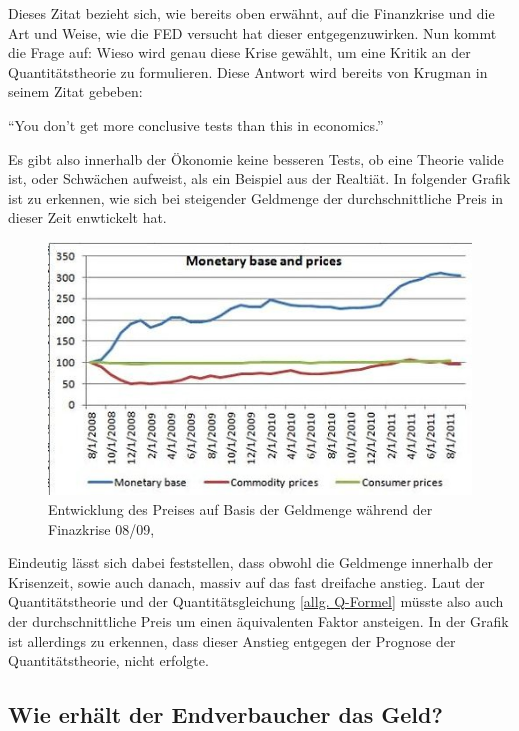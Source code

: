 Dieses Zitat bezieht sich, wie bereits oben erwähnt, auf die Finanzkrise und die Art und Weise, wie die FED versucht hat dieser entgegenzuwirken. Nun kommt die Frage auf: Wieso wird genau diese Krise gewählt, um eine Kritik an der Quantitätstheorie zu formulieren. Diese Antwort wird bereits von Krugman in seinem Zitat gebeben:
\begin{center}
    \enquote{You don’t get more conclusive tests than this in economics.}
\end{center}

Es gibt also innerhalb der Ökonomie keine besseren Tests, ob eine Theorie valide ist, oder Schwächen aufweist, als ein Beispiel aus der Realtiät. In folgender Grafik ist zu erkennen, wie sich bei steigender Geldmenge der durchschnittliche Preis in dieser Zeit enwtickelt hat.

\begin{figure}[H]
    \centering
    \includegraphics{img/100711krugman3-blog480.jpg}
    \caption{Entwicklung des Preises auf Basis der Geldmenge während der Finazkrise 08/09, \cite{Krugman2011}}
\end{figure}    

Eindeutig lässt sich dabei feststellen, dass obwohl die Geldmenge innerhalb der Krisenzeit, sowie auch danach, massiv auf das fast dreifache anstieg. Laut der Quantitätstheorie und der Quantitätsgleichung \vref{allg. Q-Formel} müsste also auch der durchschnittliche Preis um einen äquivalenten Faktor ansteigen. In der Grafik ist allerdings zu erkennen, dass dieser Anstieg entgegen der Prognose der Quantitätstheorie, nicht erfolgte.

\subsection{Wie erhält der Endverbaucher das Geld?}

